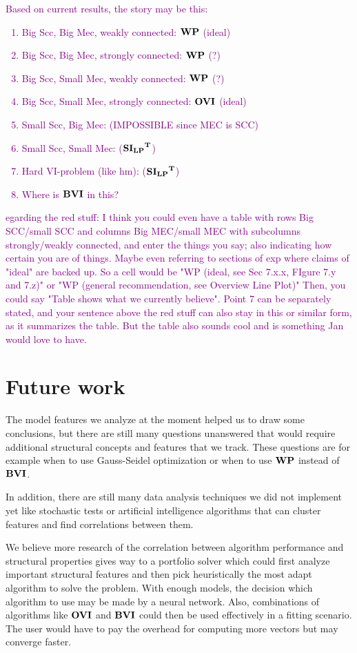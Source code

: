 \textcolor{purple}{
    Based on current results, the story may be this:
    \begin{enumerate}
        \item Big Scc, Big Mec, weakly connected: $\mathbf{WP}$ (ideal)
        \item Big Scc, Big Mec, strongly connected: $\mathbf{WP}$ (?)
        \item Big Scc, Small Mec, weakly connected: $\mathbf{WP}$ (?)
        \item Big Scc, Small Mec, strongly connected: $\mathbf{OVI}$ (ideal)
        \item Small Scc, Big Mec: (IMPOSSIBLE since MEC is SCC)
        \item Small Scc, Small Mec: ($\mathbf{\mathbf{SI_{LP}}^T}$)
        \item Hard VI-problem (like hm): ($\mathbf{\mathbf{SI_{LP}}^T}$)
        \item Where is $\mathbf{BVI}$ in this? 
    \end{enumerate}
}

\textcolor{purple}{egarding the red stuff: I think you could even have a table with rows Big SCC/small SCC and columns Big MEC/small MEC with subcolumns strongly/weakly connected, and enter the things you say; also indicating how certain you are of things. Maybe even referring to sections of exp where claims of "ideal" are backed up. So a cell would be "WP (ideal, see Sec 7.x.x, FIgure 7.y and 7.z)" or "WP (general recommendation, see Overview Line Plot)"
Then, you could say "Table shows what we currently believe". Point 7 can be separately stated, and your sentence above the red stuff can also stay in this or similar form, as it summarizes the table. But the table also sounds cool and is something Jan would love to have.}

\section*{Future work}
The model features we analyze at the moment helped us to draw some conclusions, but there are still many questions unanswered that would require
additional structural concepts and features that we track.
These questions are for example when to use Gauss-Seidel optimization or when to use $\mathbf{WP}$ instead of $\mathbf{BVI}$.

In addition, there are still many data analysis techniques we did not implement yet like stochastic tests or artificial intelligence algorithms
that can cluster features and find correlations between them. 

We believe more research of the correlation between algorithm performance and structural properties gives way to a portfolio solver which could first
analyze important structural features and then pick heuristically the most adapt algorithm to solve the problem.
With enough models, the decision which algorithm to use may be made by a neural network.
Also, combinations of algorithms like $\mathbf{OVI}$ and $\mathbf{BVI}$ could then be used effectively in a fitting scenario.
The user would have to pay the overhead for computing more vectors but may converge faster.

